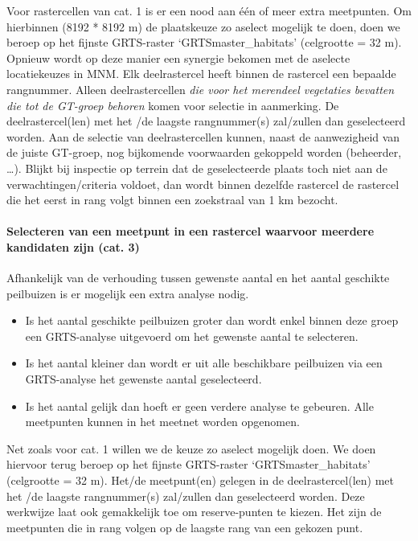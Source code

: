 \documentclass[11pt,]{book}
\let\oldparagraph\paragraph
\renewcommand{\paragraph}[1]{\oldparagraph{#1}\mbox{}}
\begin{document}
Voor rastercellen van cat. 1 is er een nood aan één of meer extra
meetpunten. Om hierbinnen (8192 * 8192 m) de plaatskeuze zo aselect
mogelijk te doen, doen we beroep op het fijnste GRTS-raster
`GRTSmaster\_habitats' (celgrootte = 32 m). Opnieuw wordt op deze manier
een synergie bekomen met de aselecte locatiekeuzes in MNM. Elk
deelrastercel heeft binnen de rastercel een bepaalde rangnummer. Alleen
deelrastercellen \emph{die voor het merendeel vegetaties bevatten die
tot de GT-groep behoren} komen voor selectie in aanmerking. De
deelrastercel(len) met het /de laagste rangnummer(s) zal/zullen dan
geselecteerd worden. Aan de selectie van deelrastercellen kunnen, naast
de aanwezigheid van de juiste GT-groep, nog bijkomende voorwaarden
gekoppeld worden (beheerder, \ldots{}). Blijkt bij inspectie op terrein
dat de geselecteerde plaats toch niet aan de verwachtingen/criteria
voldoet, dan wordt binnen dezelfde rastercel de rastercel die het eerst
in rang volgt binnen een zoekstraal van 1 km bezocht.

\paragraph{Selecteren van een meetpunt in een rastercel waarvoor
meerdere kandidaten zijn (cat. 3)}\label{sel-habvlek}

Afhankelijk van de verhouding tussen gewenste aantal en het aantal
geschikte peilbuizen is er mogelijk een extra analyse nodig.

\begin{itemize}
\item
  Is het aantal geschikte peilbuizen groter dan wordt enkel binnen deze
  groep een GRTS-analyse uitgevoerd om het gewenste aantal te
  selecteren.
\item
  Is het aantal kleiner dan wordt er uit alle beschikbare peilbuizen via
  een GRTS-analyse het gewenste aantal geselecteerd.
\item
  Is het aantal gelijk dan hoeft er geen verdere analyse te gebeuren.
  Alle meetpunten kunnen in het meetnet worden opgenomen.
\end{itemize}

Net zoals voor cat. 1 willen we de keuze zo aselect mogelijk doen. We
doen hiervoor terug beroep op het fijnste GRTS-raster
`GRTSmaster\_habitats' (celgrootte = 32 m). Het/de meetpunt(en) gelegen
in de deelrastercel(len) met het /de laagste rangnummer(s) zal/zullen
dan geselecteerd worden. Deze werkwijze laat ook gemakkelijk toe om
reserve-punten te kiezen. Het zijn de meetpunten die in rang volgen op
de laagste rang van een gekozen punt.
\end{document}
